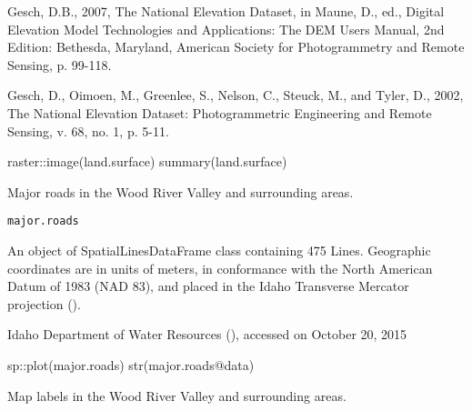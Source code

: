 \documentclass[a4paper]{book}
\begin{document}
%
\begin{References}\relax
Gesch, D.B., 2007, The National Elevation Dataset, in Maune, D., ed.,
Digital Elevation Model Technologies and Applications: The DEM Users Manual,
2nd Edition: Bethesda, Maryland, American Society for Photogrammetry and Remote Sensing,
p. 99-118.

Gesch, D., Oimoen, M., Greenlee, S., Nelson, C., Steuck, M., and Tyler, D., 2002,
The National Elevation Dataset: Photogrammetric Engineering and Remote Sensing,
v. 68, no. 1, p. 5-11.
\end{References}
%
\begin{Examples}
\begin{ExampleCode}
raster::image(land.surface)
summary(land.surface)

\end{ExampleCode}
\end{Examples}
%
\begin{Description}\relax
Major roads in the Wood River Valley and surrounding areas.
\end{Description}
%
\begin{Usage}
\begin{verbatim}
major.roads
\end{verbatim}
\end{Usage}
%
\begin{Format}
An object of SpatialLinesDataFrame class containing 475 Lines.
Geographic coordinates are in units of meters, in conformance with the
North American Datum of 1983 (NAD 83), and placed in the
Idaho Transverse Mercator projection ().
\end{Format}
%
\begin{Source}\relax
Idaho Department of Water Resources
(),
accessed on October 20, 2015
\end{Source}
%
\begin{Examples}
\begin{ExampleCode}
sp::plot(major.roads)
str(major.roads@data)

\end{ExampleCode}
\end{Examples}
%
\begin{Description}\relax
Map labels in the Wood River Valley and surrounding areas.
\end{Description}
\end{document}
